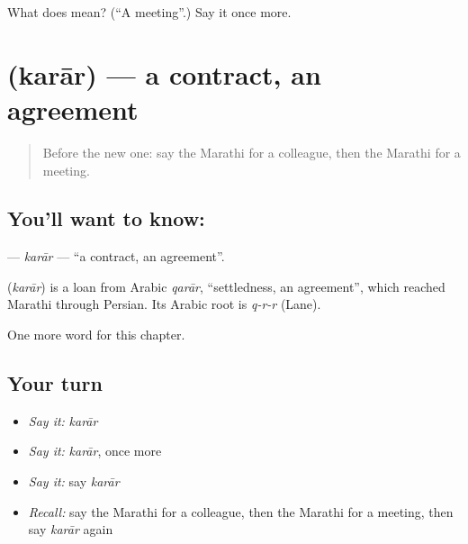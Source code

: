 \begin{tcolorbox}[breakable,colback=teal!4,colframe=teal!35!black,title={Before you move on}]
What does  mean? (\textquotedblleft{}A meeting\textquotedblright{}.) Say it once more.
\end{tcolorbox}
\section[\texorpdfstring{\mr{करार} (karār)}{करार (karār)}]{ (karār) — a contract, an agreement}

\label{lesson:MR-C192-karar}



\begin{quote}
Before the new one: say the Marathi for a colleague, then the Marathi for a meeting.
\end{quote}

\subsection*{You'll want to know: }
\textbf{} — \emph{karār} — \textquotedblleft{}a contract, an agreement\textquotedblright{}.

\begin{cousinweb}
\textbf{} (\emph{karār}) is a loan from Arabic \emph{qarār}, \textquotedblleft{}settledness, an agreement\textquotedblright{}, which reached Marathi through Persian. Its Arabic root is \emph{q-r-r} (Lane).
\end{cousinweb}

\begin{grammarlens}[title={What you've built}]
One more word for this chapter.
\end{grammarlens}

\subsection*{Your turn}
\begin{itemize}
\raggedright
  \item \emph{Say it:} \emph{karār}
  \item \emph{Say it:} \emph{karār}, once more
  \item \emph{Say it:} say \emph{karār}
  \item \emph{Recall:} say the Marathi for a colleague, then the Marathi for a meeting, then say \emph{karār} again
\end{itemize}

